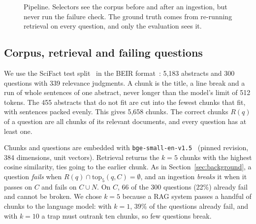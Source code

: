 \begin{figure}[htbp]
{}
  \caption{Pipeline. Selectors see the corpus before and after an ingestion,
  but never run the failure check. The ground truth comes from re-running
  retrieval on every question, and only the evaluation sees it.}
  \label{fig:pipeline}
\end{figure}

\subsection{Corpus, retrieval and failing questions}
\label{sec:method-retrieval}

We use the SciFact test split~\cite{wadden2020scifact} in the BEIR
format~\cite{thakur2021beir}: 5,183 abstracts and 300 questions with 339
relevance judgments. A chunk is the title, a line break and a run of whole
sentences of one abstract, never longer than the model's limit of 512 tokens.
The 455 abstracts that do not fit are cut into the fewest chunks that fit,
with sentences packed evenly. This gives 5,658 chunks. The correct chunks
$R(q)$ of a question are all chunks of its relevant documents, and every
question has at least one.

Chunks and questions are embedded with
\texttt{bge-small-en-v1.5}~\cite{xiao2024cpack} (pinned revision, 384
dimensions, unit vectors). Retrieval returns the $k = 5$ chunks with the
highest cosine similarity, ties going to the earlier chunk. As in
Section~\ref{sec:background}, a question \emph{fails} when
$R(q) \cap \mathrm{top}_5(q, C) = \emptyset$, and an ingestion \emph{breaks}
it when it passes on $C$ and fails on $C \cup N$. On $C$, 66 of the 300
questions (22\%) already fail and cannot be broken. We chose $k = 5$ because
a RAG system passes a handful of chunks to the language model: with $k = 1$,
39\% of the questions already fail, and with $k = 10$ a trap must outrank ten
chunks, so few questions break.

